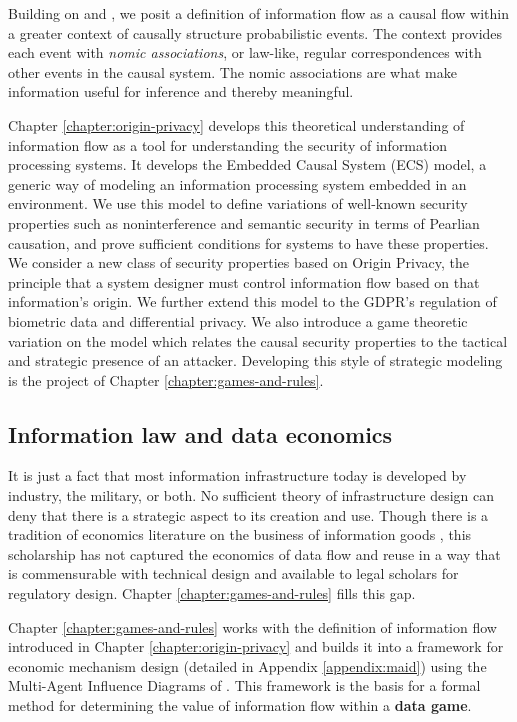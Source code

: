 \documentclass[../thesis.tex]{subfiles}
\begin{document}
 Building on \citet{dretske1981knowledge}
 and \citet{pearl2009causality}, we posit a definition
 of information flow as a causal flow within a greater
 context of causally structure probabilistic events.
 The context provides each event with
 \textit{nomic associations}, or law-like, regular
 correspondences with other events in the causal system.
 The nomic associations are what make information useful
 for inference and thereby meaningful.

 Chapter \ref{chapter:origin-privacy} develops this
 theoretical understanding of information flow as a
 tool for understanding the security of information processing
 systems.
 It develops the Embedded Causal System (ECS) model,
 a generic way of modeling an information processing system
 embedded in an environment.
 We use this model to define variations of well-known
 security properties such as noninterference and semantic
 security in terms of Pearlian causation,
 and prove sufficient conditions for systems to have these
 properties.
 We consider a new class of security properties based on
 Origin Privacy, the principle that a system designer
 must control information flow based on that information's
 origin.
 We further extend this model to the GDPR's regulation of
 biometric data and differential privacy.
 We also introduce a game theoretic variation on the model
 which relates the causal security properties to the tactical
 and strategic presence of an attacker.
 Developing this style of strategic modeling is the
 project of Chapter \ref{chapter:games-and-rules}.

 \subsection{Information law and data economics}

 It is just a fact that most information infrastructure
 today is developed by industry, the military, or both.
 No sufficient theory of infrastructure design can
 deny that there is a strategic aspect to its
 creation and use.
 Though there is a tradition of economics literature
 on the business of information goods
\cite{shapiro1998information}
\cite{varian2001economics} \cite{acquisti2016economics},
this scholarship has not captured the economics of data flow
and reuse
in a way that is commensurable with technical design and
available to legal scholars for regulatory design.
Chapter \ref{chapter:games-and-rules} fills this gap.

 Chapter \ref{chapter:games-and-rules} works with the
 definition of information flow introduced in
 Chapter \ref{chapter:origin-privacy} and builds
 it into a framework for economic mechanism design
 (detailed in Appendix \ref{appendix:maid})
 using the Multi-Agent Influence Diagrams
 of \citet{koller2003multi}.
 This framework is the basis for a formal method for
 determining the value of information flow within a
 \textbf{data game}.
\end{document}
